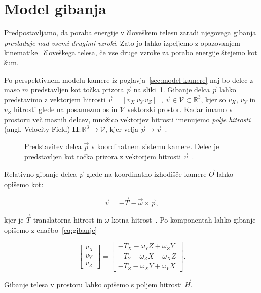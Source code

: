 \section{Model gibanja}\label{sec:model-gibanja}
Predpostavljamo, da poraba energije v človeškem telesu zaradi njegovega gibanja \emph{prevladuje nad vsemi
drugimi vzroki}. Zato jo lahko izpeljemo z opazovanjem kinematike~\cite{levine2005measurement} človeškega telesa, če vse druge vzroke za porabo energije štejemo kot šum.

Po perspektivnem modelu kamere iz poglavja~\ref{sec:model-kamere} naj bo delec z maso $m$ predstavljen kot točka prizora $\vec{p}$ na sliki~\ref{fig:model-gibanja}. Gibanje delca $\vec{p}$ lahko predstavimo z vektorjem hitrosti $\vec{v} = [v_X~v_Y~v_Z]^\top$, $\vec{v} \in \mathcal{V} \subset \mathbb{R}^3$, kjer so $v_X$, $v_Y$ in $v_Z$ hitrosti glede na posamezno os in $\mathcal{V}$ vektorski prostor. Kadar imamo v prostoru več masnih delcev, množico vektorjev hitrosti imenujemo \emph{polje hitrosti} (angl. Velocity Field) $\mathbf{H}: \mathbb{R}^3 \to \mathcal{V}$, kjer velja $\vec{p} \mapsto \vec{v}$~\cite{trucco1998introductory}.


\begin{figure}[htb]
\centering

\caption[Predstavitev delca $\vec{p}$ v koordinatnem sistemu kamere]{Predstavitev delca $\vec{p}$ v koordinatnem sistemu kamere. Delec je predstavljen kot točka prizora z vektorjem hitrosti $\vec{v}$~\cite{trucco1998introductory}.}
\label{fig:model-gibanja}
\end{figure}



Relativno gibanje delca $\vec{p}$ glede na koordinatno izhodišče kamere $\vec{O}$ lahko opišemo kot:

\begin{equation}
	\vec{v} = -\vec{T}-\vec{\omega}\times\vec{p},
\end{equation}

kjer je $\vec{T}$ translatorna hitrost in $\omega$ kotna hitrost~\cite{trucco1998introductory}. Po komponentah lahko gibanje opišemo z enačbo~\eqref{eq:gibanje}

\begin{equation} \label{eq:gibanje}
	\begin{bmatrix}
	v_X \\ v_Y \\ v_Z
	\end{bmatrix}
    =
    \begin{bmatrix}
    - T_X - \omega_Y Z + \omega_Z Y \\
    - T_Y - \omega_Z X + \omega_X Z \\
    - T_Z - \omega_X Y + \omega_Y X
    \end{bmatrix}.
\end{equation}

Gibanje telesa v prostoru lahko opišemo s poljem hitrosti $\vec{H}$.


